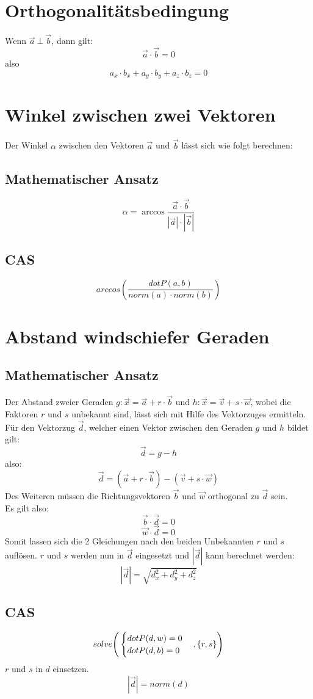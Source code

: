 \documentclass[a4paper,12pt]{article}
\begin{document}
\section{Orthogonalitätsbedingung}
Wenn $\vec{a}\ \bot\ \vec{b}$, dann gilt:
$$\vec{a} \cdot \vec{b} = 0$$
also
$$a_x \cdot b_x + a_y \cdot b_y + a_z \cdot b_z = 0$$
\section{Winkel zwischen zwei Vektoren}
Der Winkel $\alpha$ zwischen den Vektoren $\vec{a}$ und $\vec{b}$ lässt sich wie folgt berechnen:
\subsection{Mathematischer Ansatz}
$$\alpha = \arccos{\frac{\vec{a} \cdot \vec{b}}{|\vec{a}| \cdot |\vec{b}|}}$$
\subsection{CAS}
$$arccos(\frac{dotP(a, b)}{norm(a) \cdot norm(b)})$$
\pagebreak
\section{Abstand windschiefer Geraden}
\subsection{Mathematischer Ansatz}
Der Abstand zweier Geraden $g : \vec{x} = \vec{a} + r \cdot \vec{b}$ und $h : \vec{x} = \vec{v} + s \cdot \vec{w}$, wobei die Faktoren $r$ und $s$ unbekannt sind, lässt sich mit Hilfe des Vektorzuges ermitteln.\\
Für den Vektorzug $\vec{d}$, welcher einen Vektor zwischen den Geraden $g$ und $h$ bildet gilt:
$$\vec{d} = g - h$$
also:
$$\vec{d} = (\vec{a} + r \cdot \vec{b}) - (\vec{v} + s \cdot \vec{w})$$
Des Weiteren müssen die Richtungsvektoren $\vec{b}$ und $\vec{w}$ orthogonal zu $\vec{d}$ sein.\\
Es gilt also:
$$\vec{b} \cdot \vec{d} = 0$$
$$\vec{w} \cdot \vec{d} = 0$$
Somit lassen sich die 2 Gleichungen nach den beiden Unbekannten $r$ und $s$ auflösen.
$r$ und $s$ werden nun in $\vec{d}$ eingesetzt und $|\vec{d}|$ kann berechnet werden:
$$|\vec{d}| = \sqrt{d_{x}^{2} + d_{y}^{2} + d_{z}^{2}}$$
\subsection{CAS}
\[
solve \Bigg{(}
\begin{cases}
dotP(d,w) = 0\\
dotP(d,b) = 0
\end{cases}
,\{r,s\}\Bigg{)}
\]
$r$ und $s$ in $d$ einsetzen.\\
$$|\vec{d}| = norm(d)$$
\pagebreak
\end{document}
